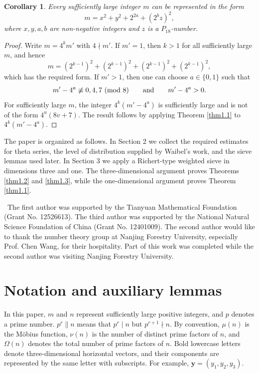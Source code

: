 \documentclass[12pt,a4paper,reqno]{amsart}
\numberwithin{equation}{section}
\def\pmod #1{\ ({\rm{mod}}\ #1)}
\def\Ack{\medskip\noindent {\bf Acknowledgments}}
\theoremstyle{plain}
\newtheorem{corollary}{Corollary}
\theoremstyle{definition}
\begin{document}
\begin{corollary}\label{cor1.2}
Every sufficiently large integer $m$ can be represented in the form
\[
m = x^2 + y^2 + 2^{2a} + (2^b z)^2,
\]
where $x, y, a, b$ are non-negative integers and $z$ is a $P_{18}$-number.
\end{corollary}
\begin{proof}
Write $m=4^k m'$ with $4\nmid m'$. If $m'=1$, then $k>1$ for all sufficiently large $m$, and hence
\[
m=(2^{k-1})^2+(2^{k-1})^2+(2^{k-1})^2+(2^{k-1})^2,
\]
which has the required form. If $m'>1$, then one can choose $a\in\{0,1\}$ such that
\[
m'-4^a\not\equiv0,4,7\pmod 8
\qquad\text{and}\qquad
m'-4^a>0.
\]
For sufficiently large $m$, the integer $4^k(m'-4^a)$ is sufficiently large and is not of the form $4^u(8v+7)$. The result follows by applying Theorem \ref{thm1.1} to $4^k(m'-4^a)$.
\end{proof}

The paper is organized as follows. In Section 2 we collect the required estimates for theta series, the level of distribution supplied by Waibel's work, and the sieve lemmas used later. In Section 3 we apply a Richert-type weighted sieve in dimensions three and one. The three-dimensional argument proves Theorems \ref{thm1.2} and \ref{thm1.3}, while the one-dimensional argument proves Theorem \ref{thm1.1}.

\Ack\ The first author was supported by the Tianyuan Mathematical Foundation (Grant No. 12526613). The third author was supported by the National Natural Science Foundation of China (Grant No. 12401009). The second author would like to thank the number theory group at Nanjing Forestry University, especially Prof. Chen Wang, for their hospitality. Part of this work was completed while the second author was visiting Nanjing Forestry University.









\section{Notation and auxiliary lemmas}
\setcounter{lemma}{0}
\setcounter{theorem}{0}
\setcounter{corollary}{0}
\setcounter{remark}{0}
\setcounter{equation}{0}
In this paper, $m$ and $n$ represent sufficiently large positive integers, and $p$ denotes a prime number. $p^r \parallel n$ means that $p^r \mid n$ but $p^{r+1} \nmid n$. By convention, $\mu(n)$ is the M\"obius function, $\nu(n)$ is the number of distinct prime factors of $n$,
and $\Omega(n)$ denotes the total number of prime factors of $n$. 
Bold lowercase letters denote three-dimensional horizontal vectors, and their components are represented by the same letter with subscripts. For example, $\mathbf{y} = (y_1, y_2, y_3)$.
\end{document}
